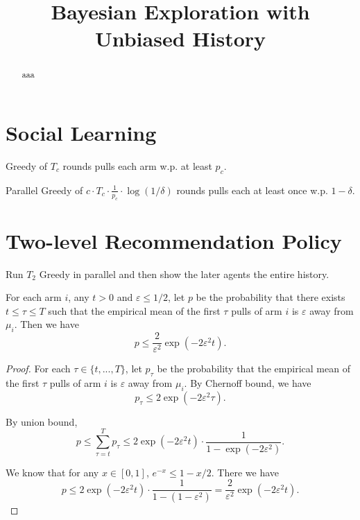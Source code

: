 \documentclass[11pt]{article}
\title{Bayesian Exploration with Unbiased History}
\author{
}
\def\ALGG{Greedy }
\def\ALGPG{Parallel Greedy }
\begin{document}
\begin{titlepage}
\maketitle

\thispagestyle{empty}
\begin{abstract}
aaa
\end{abstract}
\end{titlepage}




\section{Social Learning}
\begin{lemma}
\ALGG of $T_c$ rounds pulls each arm w.p. at least $p_c$. 
\end{lemma}


\begin{corollary}
\ALGPG of $c \cdot T_c \cdot \frac{1}{p_c} \cdot \log(1/\delta)$ rounds pulls each at least once w.p. $1-\delta$. 
\end{corollary}

\section{Two-level Recommendation Policy}
Run $T_2$ \ALGG in parallel and then show the later agents the entire history. 

\begin{lemma}
For each arm $i$, any $t > 0$ and $\varepsilon \leq 1/2$, let $p$ be the probability that there exists $t \leq \tau \leq T$ such that the empirical mean of the first $\tau$ pulls of arm $i$ is $\varepsilon$ away from $\mu_i$. Then we have 
\[
p \leq \frac{2}{\varepsilon^2} \exp(-2\varepsilon^2 t).
\]
\end{lemma}

\begin{proof}
For each $\tau \in \{t,...,T\}$, let $p_{\tau}$ be the probability that the empirical mean of the first $\tau$ pulls of arm $i$ is $\varepsilon$ away from $\mu_i$. By Chernoff bound, we have
\[
p_{\tau} \leq 2 \exp(-2\varepsilon^2 \tau).
\]

By union bound,
\[
p \leq \sum_{\tau = t}^T p_{\tau} \leq 2 \exp(-2\varepsilon^2 t)  \cdot \frac{1}{1-\exp(-2\varepsilon^2)}.
\]

We know that for any $ x \in [0,1]$, $e^{-x} \leq 1-x/2$. There we have
\[
p \leq  2 \exp(-2\varepsilon^2 t)  \cdot \frac{1}{1-(1-\varepsilon^2)} =  \frac{2}{\varepsilon^2} \exp(-2\varepsilon^2 t).
\]
\end{proof}
\end{document}
